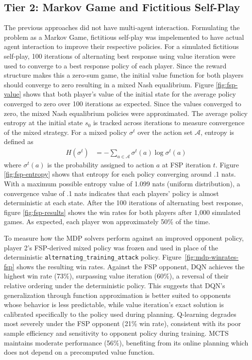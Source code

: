 \documentclass[conference]{IEEEtran}
\begin{document}
\subsection{Tier 2: Markov Game and Fictitious Self-Play}
The previous approaches did not have multi-agent interaction. Formulating the problem as a Markov Game, fictitious self-play was impelemented to have actual agent interaction to improve their respective policies. For a simulated fictitious self-play, 100 iterations of alternating best response using value iteration were used to converge to a best response policy of each player. Since the reward structure makes this a zero-sum game, the initial value function for both players should converge to zero resulting in a mixed Nash equalibrium. Figure \ref{fig:fsp-value} shows that both player's value of the initial state for the average policy converged to zero over 100 iterations as expected. Since the values converged to zero, the mixed Nash equalibrium policies were approximated. The average policy entropy at the initial state $s_0$ is tracked across iterations to
measure convergence of the mixed strategy. For a mixed policy $\sigma^t$ over the
action set $\mathcal{A}$, entropy is defined as
\begin{align}
  H(\sigma^t) &= -\sum_{a \in \mathcal{A}} \sigma^t(a) \log \sigma^t(a)
\end{align}
where $\sigma^t(a)$ is the probability assigned to action $a$ at FSP iteration $t$. Figure \ref{fig:fsp-entropy} shows that entropy for each policy converging around .1 nats. With a maximum possible entropy value of 1.099 nats (uniform distribution), a convergence value of .1 nats indicates that each players' policy is almost deterministic at each state. After the 100 iterations of alternating best response, figure \ref{fig:fsp-results} shows the win rates for both players after 1,000 simulated games. As expected, each player won approximately 50\% of the time. 

To measure how the MDP solvers perform against an improved opponent policy, player 2's FSP-derived mixed policy was frozen and used in place of the deterministic \texttt{alternating\_training\_attack} policy. Figure~\ref{fig:mdp-winrates-fsp} shows the resulting win rates. Against the FSP opponent, DQN achieves the highest win rate (73\%), surpassing value iteration (60\%), a reversal of their relative ordering under the deterministic policy. This suggests that DQN's generalization through function approximation is better suited to opponents whose behavior is less predictable, while value iteration's exact solution is calibrated specifically to the policy used during planning. Q-learning degrades most severely under the FSP opponent (21\% win rate), consistent with its poor sample efficiency and sensitivity to opponent policy during training. MCTS maintains moderate performance (56\%), benefiting from its online planning which does not depend on a precomputed value function.
\end{document}
